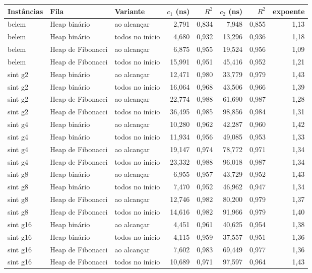 \begin{tabular}{lllrrrrr}
\toprule
Instâncias & Fila & Variante & $c_1$ (ns) & $R^2$ & $c_2$ (ns) & $R^2$ & expoente \\
\midrule
belem & Heap binário & ao alcançar & 2,791 & 0,834 & 7,948 & 0,855 & 1,13 \\
belem & Heap binário & todos no início & 4,680 & 0,932 & 13,296 & 0,936 & 1,18 \\
belem & Heap de Fibonacci & ao alcançar & 6,875 & 0,955 & 19,524 & 0,956 & 1,09 \\
belem & Heap de Fibonacci & todos no início & 15,991 & 0,951 & 45,416 & 0,952 & 1,21 \\
sint g2 & Heap binário & ao alcançar & 12,471 & 0,980 & 33,779 & 0,979 & 1,43 \\
sint g2 & Heap binário & todos no início & 16,064 & 0,968 & 43,506 & 0,966 & 1,39 \\
sint g2 & Heap de Fibonacci & ao alcançar & 22,774 & 0,988 & 61,690 & 0,987 & 1,28 \\
sint g2 & Heap de Fibonacci & todos no início & 36,495 & 0,985 & 98,856 & 0,984 & 1,31 \\
sint g4 & Heap binário & ao alcançar & 10,280 & 0,962 & 42,287 & 0,960 & 1,42 \\
sint g4 & Heap binário & todos no início & 11,934 & 0,956 & 49,085 & 0,953 & 1,33 \\
sint g4 & Heap de Fibonacci & ao alcançar & 19,147 & 0,974 & 78,772 & 0,971 & 1,34 \\
sint g4 & Heap de Fibonacci & todos no início & 23,332 & 0,988 & 96,018 & 0,987 & 1,34 \\
sint g8 & Heap binário & ao alcançar & 6,955 & 0,957 & 43,729 & 0,952 & 1,43 \\
sint g8 & Heap binário & todos no início & 7,470 & 0,952 & 46,962 & 0,947 & 1,34 \\
sint g8 & Heap de Fibonacci & ao alcançar & 12,746 & 0,982 & 80,200 & 0,979 & 1,37 \\
sint g8 & Heap de Fibonacci & todos no início & 14,616 & 0,982 & 91,966 & 0,979 & 1,40 \\
sint g16 & Heap binário & ao alcançar & 4,451 & 0,961 & 40,625 & 0,954 & 1,38 \\
sint g16 & Heap binário & todos no início & 4,115 & 0,959 & 37,557 & 0,951 & 1,36 \\
sint g16 & Heap de Fibonacci & ao alcançar & 7,602 & 0,983 & 69,449 & 0,977 & 1,36 \\
sint g16 & Heap de Fibonacci & todos no início & 10,689 & 0,971 & 97,597 & 0,964 & 1,43 \\
\bottomrule
\end{tabular}
